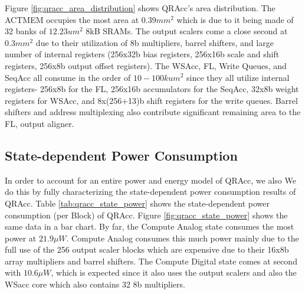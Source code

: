 Figure \ref{fig:qracc_area_distribution} shows QRAcc's area distribution. The ACTMEM occupies the most area at $0.39mm^2$ which is due to it being made of 32 banks of $12.23um^2$ 8kB SRAMs. The output scalers come a close second at $0.3mm^2$ due to their utilization of 8b multipliers, barrel shifters, and large number of internal registers (256x32b bias registers, 256x16b scale and shift registers, 256x8b output offset registers). The WSAcc, FL, Write Queues, and SeqAcc all consume in the order of $10-100kum^2$ since they all utilize internal registers- 256x8b for the FL, 256x16b accumulators for the SeqAcc, 32x8b weight registers for WSAcc, and 8x(256+13)b shift registers for the write queues. Barrel shifters and address multiplexing also contribute significant remaining area to the FL, output aligner.

\subsection{State-dependent Power Consumption}

In order to account for an entire power and energy model of QRAcc, we also 
We do this by fully characterizing the state-dependent power consumption results of QRAcc. Table \ref{tab:qracc_state_power} shows the state-dependent power consumption (per Block) of QRAcc. Figure \ref{fig:qracc_state_power} shows the same data in a bar chart. By far, the Compute Analog state consumes the most power at $21.9 \mu W$. Compute Analog consumes this much power mainly due to the full use of the 256 output scaler blocks which are expensive due to their 16x8b array multipliers and barrel shifters. The Compute Digital state comes at second with $10.6 \mu W$, which is expected since it also uses the output scalers and also the WSacc core which also contains 32 8b multipliers.

